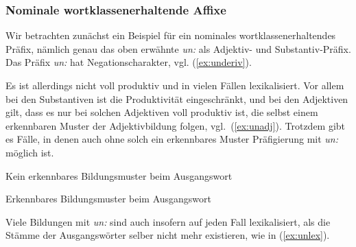 \label{sec:derivohnewaw}

\subsubsection{Nominale wortklassenerhaltende Affixe}

\label{sec:nomwklasserhaltaff}

Wir betrachten zunächst ein Beispiel für ein nominales wortklassenerhaltendes Präfix, nämlich genau das oben erwähnte \textit{un:} als Adjektiv- und Substantiv-Präfix.
Das Präfix \textit{un:} hat Negationscharakter, vgl. (\ref{ex:underiv}).

\begin{exe}
  \ex\label{ex:underiv}
  \begin{xlist}
  \end{xlist}
\end{exe}

Es ist allerdings nicht voll produktiv und in vielen Fällen lexikalisiert.
Vor allem bei den Substantiven ist die Produktivität eingeschränkt, und bei den Adjektiven gilt, dass es nur bei solchen Adjektiven voll produktiv ist, die selbst einem erkennbaren Muster der Adjektivbildung folgen, vgl.\ (\ref{ex:unadj}).
Trotzdem gibt es Fälle, in denen auch ohne solch ein erkennbares Muster Präfigierung mit \textit{un:} möglich ist.

\begin{exe}
  \ex\label{ex:unadj}
  \begin{xlist}
    \ex Kein erkennbares Bildungsmuster beim Ausgangswort
    \begin{xlist} 
    \end{xlist}
    \ex Erkennbares Bildungsmuster beim Ausgangswort
    \begin{xlist}
    \end{xlist}
  \end{xlist}
\end{exe}

Viele Bildungen mit \textit{un:} sind auch insofern auf jeden Fall lexikalisiert, als die Stämme der Ausgangswörter selber nicht mehr existieren, wie in (\ref{ex:unlex}).

\begin{exe}
  \ex\label{ex:unlex}
  \begin{xlist}
  \end{xlist}
\end{exe}

